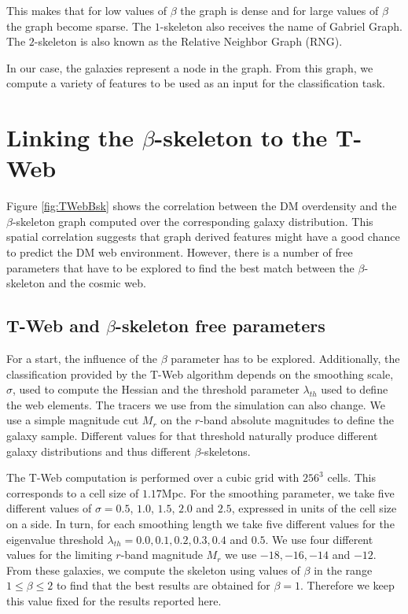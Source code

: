 \documentclass[usenatbib]{mnras}
\begin{document}
This makes that for low values of $\beta$ the graph is dense and for
large values of $\beta$ the graph become sparse. 
The $1$-skeleton also receives the name of Gabriel Graph.  
The $2$-skeleton is also known as the Relative Neighbor Graph (RNG).

In our case, the galaxies represent a node in the graph.
From this graph, we compute a variety of features to be used as an input for the classification task.

\section{Linking the $\beta$-skeleton to the T-Web}\label{sec:link}

Figure \ref{fig:TWebBsk} shows the correlation between the DM overdensity
and the $\beta$-skeleton graph computed over the corresponding galaxy
distribution. 
This spatial correlation suggests that graph derived features might have
a good chance to predict the DM web environment. 
However, there is a number of free parameters that have to be explored
to find the best match between the $\beta$-skeleton and the cosmic web.

\subsection{T-Web and $\beta$-skeleton free parameters}

For a start, the influence of the $\beta$ parameter has to be explored.
Additionally, the classification provided by the T-Web algorithm
depends on the smoothing scale, $\sigma$, used to compute the Hessian and the
threshold parameter $\lambda_{th}$ used to define the web elements.
The tracers we use from the simulation can also change. 
We use a simple magnitude cut $M_{r}$ on the $r$-band absolute magnitudes
to define the galaxy sample. 
Different values for that threshold naturally produce different galaxy
distributions and thus different $\beta$-skeletons. 

The T-Web computation is performed over a cubic grid with $256^3$
cells. 
This corresponds to a cell size of $1.17$Mpc.
For the smoothing parameter, we take five different values of $\sigma =
0.5$, $1.0$, $1.5$, $2.0$ and $2.5$, expressed in units of the cell size on a side.
In turn, for each smoothing length we take five different values for
the eigenvalue threshold
$\lambda_{th}=0.0, 0.1, 0.2, 0.3, 0.4$ and $0.5$. 
We use four different values for the limiting $r$-band magnitude
$M_{r}$ we use  $-18, -16, -14$ and $-12$.
From these galaxies, we compute the skeleton using values of $\beta$ in
the range $1\leq \beta \leq 2$ to find that the best results are
obtained for $\beta=1$.   
Therefore we keep this value fixed for the results reported here.
\end{document}
